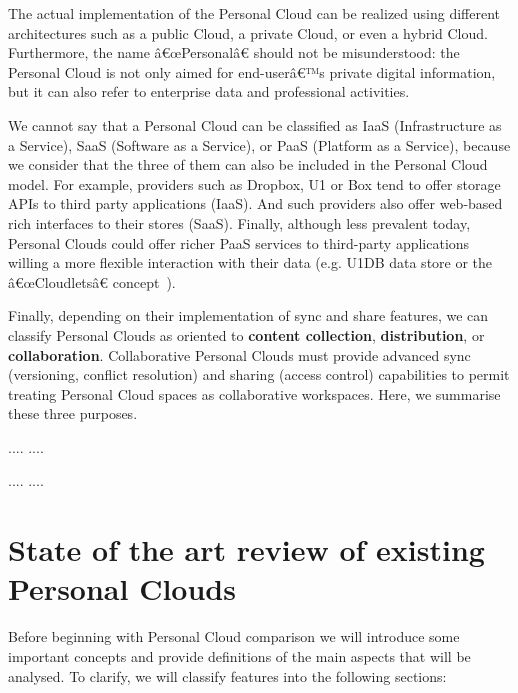 {The actual implementation of the Personal Cloud can be realized using different architectures such as a public Cloud, a private Cloud, or even a hybrid Cloud. Furthermore, the name â€œPersonalâ€ should not be misunderstood: the Personal Cloud is not only aimed for end-userâ€™s private digital information, but it can also refer to enterprise data and professional activities.


We cannot say that a Personal Cloud can be classified as  IaaS (Infrastructure as a Service), SaaS (Software as a Service), or PaaS (Platform as a Service), because we consider that the three of them can also be included in the Personal Cloud model. For example, providers such as Dropbox, U1 or Box tend to offer storage APIs to third party applications (IaaS). And such providers also offer web-based rich interfaces to their stores (SaaS). Finally, although less prevalent today, Personal Clouds could offer richer PaaS services to third-party applications willing a more flexible interaction with their data (e.g. U1DB data store or the â€œCloudletsâ€ concept~\cite{openi}).


Finally, depending on their implementation of sync and share features, we can classify Personal Clouds as oriented to \textbf{content collection},  \textbf{distribution}, or  \textbf{collaboration}. Collaborative Personal Clouds must provide advanced sync (versioning, conflict resolution) and sharing (access  control) capabilities to permit treating Personal Cloud spaces as collaborative workspaces. Here, we summarise these three purposes.

....
....

....
....

\section{State of the art review of existing Personal Clouds}


Before beginning with Personal Cloud comparison we will introduce some important concepts and provide definitions of the main aspects that will be analysed. To clarify, we will classify features into the following sections:

}
